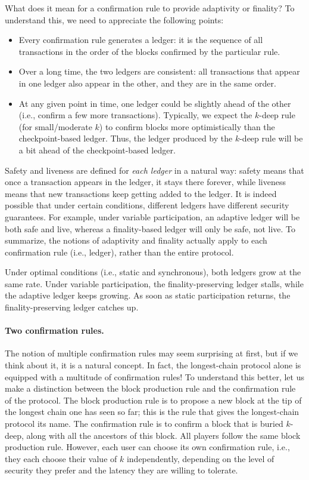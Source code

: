 \documentclass{article}
\begin{document}
What does it mean for a confirmation rule to provide adaptivity or finality? To understand this, we need to appreciate the following points:
\begin{itemize}
    \item Every confirmation rule generates a ledger: it is the sequence of all transactions in the order of the blocks confirmed by the particular rule. 
    \item Over a long time, the two ledgers are consistent: all transactions that appear in one ledger also appear in the other, and they are in the same order.
    \item At any given point in time, one ledger could be slightly ahead of the other (i.e., confirm a few more transactions). Typically, we expect the $k$-deep rule (for small/moderate $k$) to confirm blocks more optimistically than the checkpoint-based ledger. Thus, the ledger produced by the $k$-deep rule will be a bit ahead of the checkpoint-based ledger.
\end{itemize} 
Safety and liveness are defined for \textit{each ledger} in a natural way: safety means that once a transaction appears in the ledger, it stays there forever, while liveness means that new transactions keep getting added to the ledger. It is indeed possible that under certain conditions, different ledgers have different security guarantees. For example, under variable participation, an adaptive ledger will be both safe and live, whereas a finality-based ledger will only be safe, not live. To summarize, the notions of adaptivity and finality actually apply to each confirmation rule (i.e., ledger), rather than the entire protocol.

Under optimal conditions (i.e., static and synchronous), both ledgers grow at the same rate. Under variable participation, the finality-preserving ledger stalls, while the adaptive ledger keeps growing. As soon as static participation returns, the finality-preserving ledger catches up. %

\paragraph{Two confirmation rules.} The notion of multiple confirmation rules may seem surprising at first, but if we think about it, it is a natural concept. In fact, the longest-chain protocol alone is equipped with a multitude of confirmation rules! To understand this better, let us make a distinction between the block production rule and the confirmation rule of the protocol. The block production rule is to propose a new block at the tip of the longest chain one has seen so far; this is the rule that gives the longest-chain protocol its name. The confirmation rule is to confirm a block that is buried $k$-deep, along with all the ancestors of this block. All players follow the same block production rule. However, each user can choose its own confirmation rule, i.e.,  they each choose their value of $k$ independently, depending on the level of security they prefer and the latency they are willing to tolerate.
\end{document}
